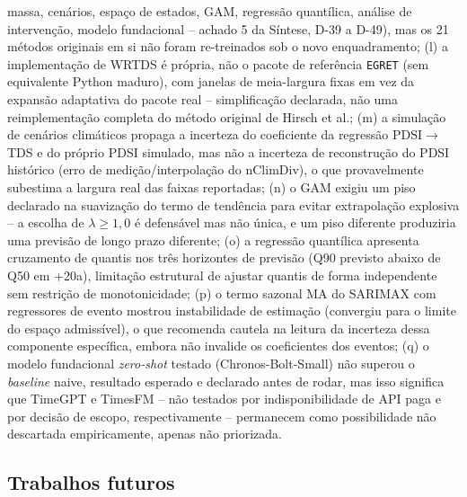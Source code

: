 massa, cenários, espaço de estados, GAM, regressão quantílica, análise de intervenção, modelo fundacional -- achado 5 da Síntese, D-39 a D-49), mas os 21 métodos originais em si não foram re-treinados sob o novo enquadramento; (l) a implementação de WRTDS é própria, não o pacote de referência \texttt{EGRET} (sem equivalente Python maduro), com janelas de meia-largura fixas em vez da expansão adaptativa do pacote real -- simplificação declarada, não uma reimplementação completa do método original de Hirsch et al.; (m) a simulação de cenários climáticos propaga a incerteza do coeficiente da regressão PDSI$\to$TDS e do próprio PDSI simulado, mas não a incerteza de reconstrução do PDSI histórico (erro de medição/interpolação do nClimDiv), o que provavelmente subestima a largura real das faixas reportadas; (n) o GAM exigiu um piso declarado na suavização do termo de tendência para evitar extrapolação explosiva -- a escolha de $\lambda\geq1{,}0$ é defensável mas não única, e um piso diferente produziria uma previsão de longo prazo diferente; (o) a regressão quantílica apresenta cruzamento de quantis nos três horizontes de previsão (Q90 previsto abaixo de Q50 em +20a), limitação estrutural de ajustar quantis de forma independente sem restrição de monotonicidade; (p) o termo sazonal MA do SARIMAX com regressores de evento mostrou instabilidade de estimação (convergiu para o limite do espaço admissível), o que recomenda cautela na leitura da incerteza dessa componente específica, embora não invalide os coeficientes dos eventos; (q) o modelo fundacional \textit{zero-shot} testado (Chronos-Bolt-Small) não superou o \textit{baseline} naive, resultado esperado e declarado antes de rodar, mas isso significa que TimeGPT e TimesFM -- não testados por indisponibilidade de API paga e por decisão de escopo, respectivamente -- permanecem como possibilidade não descartada empiricamente, apenas não priorizada.

\subsection{Trabalhos futuros}

